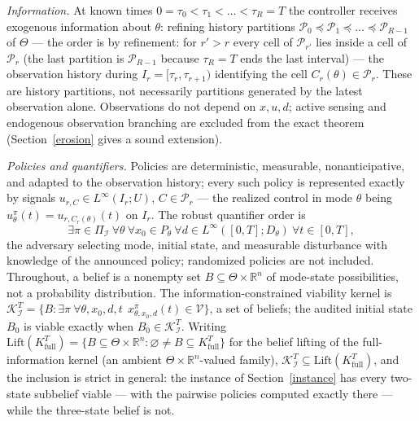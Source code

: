 \documentclass[10pt,twocolumn]{article}
\theoremstyle{plain}
\theoremstyle{definition}
\theoremstyle{remark}
\begin{document}
\emph{Information.} At known times
\(0 = \tau_0 < \tau_1 < \dots < \tau_R = T\) the controller receives
exogenous information about \(\theta\): refining history partitions
\(\mathcal{P}_0 \preceq \mathcal{P}_1 \preceq \dots \preceq \mathcal{P}_{R-1}\)
of \(\Theta\) --- the order is by refinement: for \(r' > r\) every cell of
\(\mathcal{P}_{r'}\) lies inside a cell of \(\mathcal{P}_r\) (the last
partition is \(\mathcal{P}_{R-1}\) because \(\tau_R = T\) ends the last
interval) --- the observation history during
\(I_r = [\tau_r, \tau_{r+1})\) identifying the cell \(C_r(\theta) \in
\mathcal{P}_r\). These are history partitions, not necessarily partitions
generated by the latest observation alone. Observations do not depend on
\(x, u, d\); active sensing and endogenous observation branching are excluded
from the exact theorem (Section~\ref{erosion} gives a sound extension).

\emph{Policies and quantifiers.} Policies are deterministic, measurable,
nonanticipative, and adapted to the observation history; every such policy is
represented exactly by signals \(u_{r,C} \in L^\infty(I_r; U)\),
\(C \in \mathcal{P}_r\) --- the realized control in mode \(\theta\) being
\(u^{\pi}_\theta(t) = u_{r, C_r(\theta)}(t)\) on \(I_r\). The robust quantifier order is
\[
\exists \pi \in \Pi_{\mathcal{I}}\ \forall \theta\ \forall x_0 \in P_\theta\
\forall d \in L^\infty([0,T]; D_\theta)\ \forall t \in [0,T],
\]
the adversary selecting mode, initial state, and measurable disturbance with
knowledge of the announced policy; randomized policies are not included. Throughout, a belief is a nonempty set \(B \subseteq \Theta \times
\mathbb{R}^n\) of mode-state possibilities, not a probability
distribution. The information-constrained viability kernel is
\(\mathcal{K}_{\mathcal{I}}^T = \{ B : \exists \pi\ \forall \theta, x_0,
d, t\ \ x^{\pi}_{\theta, x_0, d}(t) \in \mathcal{V} \}\), a set of
beliefs; the audited initial state \(B_0\) is viable exactly when
\(B_0 \in \mathcal{K}_{\mathcal{I}}^T\). Writing
\(\mathrm{Lift}(K^T_{\mathrm{full}}) = \{ B \subseteq \Theta \times
\mathbb{R}^n : \varnothing \ne B \subseteq K^T_{\mathrm{full}} \}\) for
the belief lifting of the full-information kernel (an ambient
\(\Theta \times \mathbb{R}^n\)-valued family), \(\mathcal{K}_{\mathcal{I}}^T \subseteq
\mathrm{Lift}(K^T_{\mathrm{full}})\), and the inclusion is strict in general:
the instance of Section~\ref{instance} has every two-state subbelief
viable --- with the pairwise policies computed exactly there --- while the
three-state belief is not.
\end{document}
